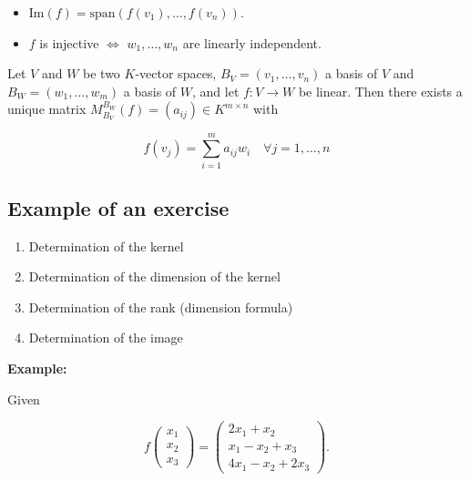 \begin{itemize}
    
    \item \(\text{Im}(f) = \text{span}(f(v_1), \dots, f(v_n))\).

    \item \(f\) is injective \(\Leftrightarrow\) \(w_1, \dots, w_n\) are linearly independent.

\end{itemize}


Let \(V\) and \(W\) be two \(K\)-vector spaces, \(B_V = (v_1, \dots, v_n)\) a basis of \(V\) and \(B_W = (w_1, \dots, w_m)\) a basis of \(W\), and let \(f : V \rightarrow W\) be linear. Then there exists a unique matrix \(M_{B_V}^{B_W}(f) = (a_{ij}) \in K^{m \times n}\) with

\[
    f(v_j) = \sum_{i=1}^{m} a_{ij}w_i \quad \forall j = 1, \dots, n
\]

\subsection{Example of an exercise}

\begin{enumerate}
    
    \item Determination of the kernel
    
    \item Determination of the dimension of the kernel
    
    \item Determination of the rank (dimension formula)
    
    \item Determination of the image

\end{enumerate}


\textbf{Example:}
\vspace{\baselineskip}
 
Given

\[
    f\begin{pmatrix}
    x_1 \\
    x_2 \\
    x_3
    \end{pmatrix} =
    \begin{pmatrix}
    2x_1 + x_2 \\
    x_1 - x_2 + x_3 \\
    4x_1 - x_2 + 2x_3
    \end{pmatrix} .
\]

